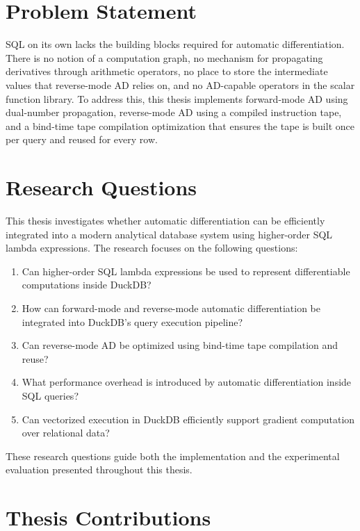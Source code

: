 \documentclass[12pt]{report}
\begin{document}
\section{Problem Statement}

SQL on its own lacks the building blocks required for automatic differentiation.
There is no notion of a computation graph, no mechanism for propagating
derivatives through arithmetic operators, no place to store the intermediate
values that reverse-mode AD relies on, and no AD-capable operators in the scalar
function library. To address this, this thesis implements forward-mode AD using
dual-number propagation, reverse-mode AD using a compiled instruction tape, and
a bind-time tape compilation optimization that ensures the tape is built once
per query and reused for every row.

\section{Research Questions}

This thesis investigates whether automatic differentiation can be efficiently
integrated into a modern analytical database system using higher-order SQL
lambda expressions. The research focuses on the following questions:

\begin{enumerate}
  \item Can higher-order SQL lambda expressions be used to represent
        differentiable computations inside DuckDB?
  \item How can forward-mode and reverse-mode automatic differentiation be
        integrated into DuckDB's query execution pipeline?
  \item Can reverse-mode AD be optimized using bind-time tape compilation and
        reuse?
  \item What performance overhead is introduced by automatic differentiation
        inside SQL queries?
  \item Can vectorized execution in DuckDB efficiently support gradient
        computation over relational data?
\end{enumerate}

These research questions guide both the implementation and the experimental
evaluation presented throughout this thesis.

\section{Thesis Contributions}
\end{document}

